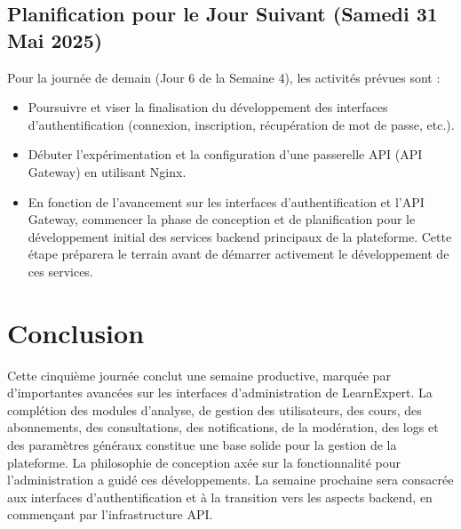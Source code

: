 \documentclass[12pt, a4paper]{article}
\begin{document}
\subsection{Planification pour le Jour Suivant (Samedi 31 Mai 2025)}
Pour la journée de demain (Jour 6 de la Semaine 4), les activités prévues sont :
\begin{itemize}
  \item Poursuivre et viser la finalisation du développement des interfaces d'authentification (connexion, inscription, récupération de mot de passe, etc.).
  \item Débuter l'expérimentation et la configuration d'une passerelle API (API Gateway) en utilisant Nginx.
  \item En fonction de l'avancement sur les interfaces d'authentification et l'API Gateway, commencer la phase de conception et de planification pour le développement initial des services backend principaux de la plateforme. Cette étape préparera le terrain avant de démarrer activement le développement de ces services.
\end{itemize}

\section{Conclusion}
Cette cinquième journée conclut une semaine productive, marquée par d'importantes avancées sur les interfaces d'administration de LearnExpert. La complétion des modules d'analyse, de gestion des utilisateurs, des cours, des abonnements, des consultations, des notifications, de la modération, des logs et des paramètres généraux constitue une base solide pour la gestion de la plateforme. La philosophie de conception axée sur la fonctionnalité pour l'administration a guidé ces développements. La semaine prochaine sera consacrée aux interfaces d'authentification et à la transition vers les aspects backend, en commençant par l'infrastructure API.
\end{document}
